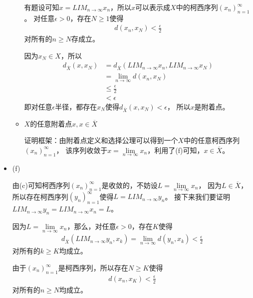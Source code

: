 \documentclass{article}
\begin{document}
\begin{itemize}
\begin{itemize}
                有题设可知$x = LIM_{n \to \infty} x_n$，所以$x$可以表示成$X$中的柯西序列$(x_n)_{n=1}^\infty$。
                对任意$\epsilon > 0$，存在$N \geq 1$使得
                \begin{align*}
                  d(x_n, x_N) < \frac{\epsilon}{2}
                \end{align*}
                对所有的$n \geq N$存成立。

                因为$x_N \in X$，所以
                \begin{align*}
                  d_{\overline{X}}(x, x_N) & = d_{\overline{X}}(LIM_{n \to \infty} x_n, LIM_{n \to \infty} x_N) \\
                                           & = \lim \limits_{n \to \infty} d(x_n, x_N)                          \\
                                           & \leq \frac{\epsilon}{2}                                            \\
                                           & < \epsilon
                \end{align*}
                即对任意$\epsilon$半径，都存在$x_N$使得$d_{\overline{X}}(x, x_N) < \epsilon$，
                所以$x$是附着点。

          \item $X$的任意附着点$x, x \in \overline{X}$

                证明框架：由附着点定义和选择公理可以得到一个$X$中的任意柯西序列$(x_n)_{n=1}^\infty$，
                该序列收敛于$x = \lim\limits_{n \to \infty} x_n$，利用了(f)可知，$x \in \overline{X}$。
        \end{itemize}

  \item (f)

        由(c)可知柯西序列$(x_n)_{n=1}^\infty$是收敛的，不妨设$L = \lim\limits_{n \to \infty} x_n$，
        因为$L \in \overline{X}$，所以存在柯西序列$(y_n)_{n=1}^\infty$使得$L = LIM_{n \to \infty} y_n$。
        接下来我们要证明$LIM_{n \to \infty} y_n = LIM_{n \to \infty} x_n = L$。

        因为$L = \lim\limits_{n \to \infty} x_n$，那么，对任意$\epsilon > 0$，存在$K$使得
        \begin{align*}
          d_{\overline{X}}(LIM_{n \to \infty} y_n, x_k) = \lim\limits_{n \to \infty} d(y_n, x_k) < \frac{\epsilon}{2}
        \end{align*}
        对所有的$k \geq K$均成立。

        由于$(x_n)_{n=1}^\infty$是柯西序列，所以存在$N \geq K$使得
        \begin{align*}
          d(x_n, x_K) < \frac{\epsilon}{2}
        \end{align*}
        对所有的$n \geq N$均成立。


\end{itemize}
\end{document}

